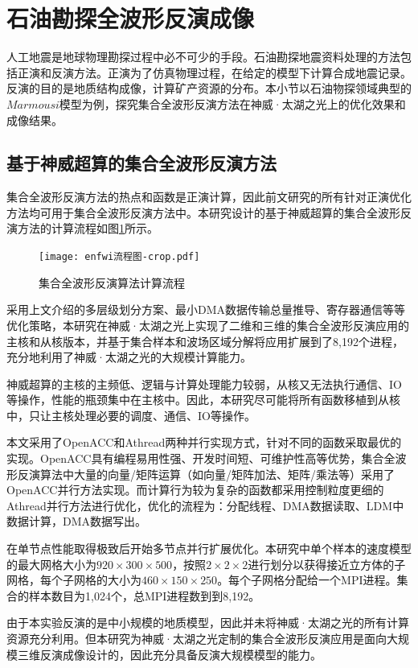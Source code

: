 \section{石油勘探全波形反演成像} %

人工地震是地球物理勘探过程中必不可少的手段。石油勘探地震资料处理的方法包括正演和反演方法。正演为了仿真物理过程，在给定的模型下计算合成地震记录。反演的目的是地质结构成像，计算矿产资源的分布。本小节以石油物探领域典型的$Marmousi$模型为例，探究集合全波形反演方法在神威·太湖之光上的优化效果和成像结果。

\subsection{基于神威超算的集合全波形反演方法}

集合全波形反演方法的热点和函数是正演计算，因此前文研究的所有针对正演优化方法均可用于集合全波形反演方法中。本研究设计的基于神威超算的集合全波形反演方法的计算流程如图\ref{fig:enfwi-flow}所示。

\begin{figure}[ht]
\centering
\texttt{[image: enfwi流程图-crop.pdf]}
\caption{集合全波形反演算法计算流程}
\label{fig:enfwi-flow}
\end{figure}

采用上文介绍的多层级划分方案、最小DMA数据传输总量推导、寄存器通信等等优化策略，本研究在神威·太湖之光上实现了二维和三维的集合全波形反演应用的主核和从核版本，并基于集合样本和波场区域分解将应用扩展到了8,192个进程，充分地利用了神威·太湖之光的大规模计算能力。

神威超算的主核的主频低、逻辑与计算处理能力较弱，从核又无法执行通信、IO等操作，性能的瓶颈集中在主核中。因此，本研究尽可能将所有函数移植到从核中，只让主核处理必要的调度、通信、IO等操作。

本文采用了OpenACC和Athread两种并行实现方式，针对不同的函数采取最优的实现。OpenACC具有编程易用性强、开发时间短、可维护性高等优势，集合全波形反演算法中大量的向量/矩阵运算（如向量/矩阵加法、矩阵/乘法等）采用了OpenACC并行方法实现。而计算行为较为复杂的函数都采用控制粒度更细的Athread并行方法进行优化，优化的流程为：分配线程、DMA数据读取、LDM中数据计算，DMA数据写出。

在单节点性能取得极致后开始多节点并行扩展优化。本研究中单个样本的速度模型的最大网格大小为$920\times 300 \times 500$，按照$2\times 2 \times 2$进行划分以获得接近立方体的子网格，每个子网格的大小为$460\times150\times250$。每个子网格分配给一个MPI进程。集合的样本数目为1,024个，总MPI进程数到到8,192。

由于本实验反演的是中小规模的地质模型，因此并未将神威·太湖之光的所有计算资源充分利用。但本研究为神威·太湖之光定制的集合全波形反演应用是面向大规模三维反演成像设计的，因此充分具备反演大规模模型的能力。

